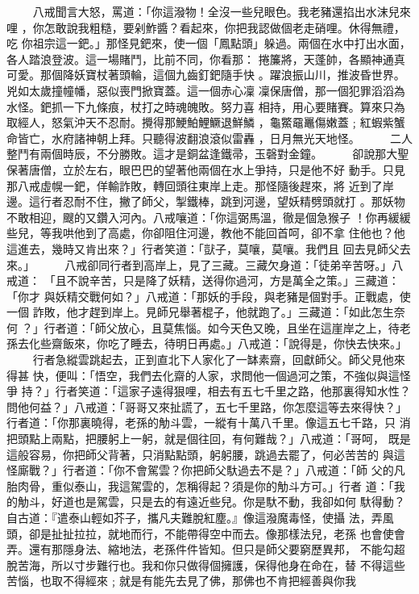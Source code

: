 \begin{pinyinscope}
{　　
八戒聞言大怒，罵道：「你這潑物！全沒一些兒眼色。我老豬還掐出水沫兒來哩
，你怎敢說我粗糙，要剁鮓醬？看起來，你把我認做個老走硝哩。休得無禮，吃
你祖宗這一鈀。」那怪見鈀來，使一個「鳳點頭」躲過。兩個在水中打出水面，
各人踏浪登波。這一場賭鬥，比前不同，你看那：
捲簾將，天蓬帥，各顯神通真可愛。那個降妖寶杖著頭輪，這個九齒釘鈀隨手快
。躍浪振山川，推波昏世界。兇如太歲撞幢幡，惡似喪門掀寶蓋。這一個赤心凜
凜保唐僧，那一個犯罪滔滔為水怪。鈀抓一下九條痕，杖打之時魂魄敗。努力喜
相持，用心要賭賽。算來只為取經人，怒氣沖天不忍耐。攪得那鯁鮊鯉鱖退鮮鱗
，龜鱉黿鼉傷嫩蓋﹔紅蝦紫蟹命皆亡，水府諸神朝上拜。只聽得波翻浪滾似雷轟
，日月無光天地怪。
　　
二人整鬥有兩個時辰，不分勝敗。這才是銅盆逢鐵帚，玉磬對金鐘。
　　
卻說那大聖保著唐僧，立於左右，眼巴巴的望著他兩個在水上爭持，只是他不好
動手。只見那八戒虛幌一鈀，佯輸詐敗，轉回頭往東岸上走。那怪隨後趕來，將
近到了岸邊。這行者忍耐不住，撇了師父，掣鐵棒，跳到河邊，望妖精劈頭就打
。那妖物不敢相迎，颼的又鑽入河內。八戒嚷道：「你這弼馬溫，徹是個急猴子
！你再緩緩些兒，等我哄他到了高處，你卻阻住河邊，教他不能回首呵，卻不拿
住他也？他這進去，幾時又肯出來？」行者笑道：「獃子，莫嚷，莫嚷。我們且
回去見師父去來。」
　　
八戒卻同行者到高岸上，見了三藏。三藏欠身道：「徒弟辛苦呀。」八戒道：
「且不說辛苦，只是降了妖精，送得你過河，方是萬全之策。」三藏道：「你才
與妖精交戰何如？」八戒道：「那妖的手段，與老豬是個對手。正戰處，使一個
詐敗，他才趕到岸上。見師兄舉著棍子，他就跑了。」三藏道：「如此怎生奈何
？」行者道：「師父放心，且莫焦惱。如今天色又晚，且坐在這崖岸之上，待老
孫去化些齋飯來，你吃了睡去，待明日再處。」八戒道：「說得是，你快去快來。」
　　
行者急縱雲跳起去，正到直北下人家化了一缽素齋，回獻師父。師父見他來得甚
快，便叫：「悟空，我們去化齋的人家，求問他一個過河之策，不強似與這怪爭
持？」行者笑道：「這家子遠得狠哩，相去有五七千里之路，他那裏得知水性？
問他何益？」八戒道：「哥哥又來扯謊了，五七千里路，你怎麼這等去來得快？」
行者道：「你那裏曉得，老孫的觔斗雲，一縱有十萬八千里。像這五七千路，只
消把頭點上兩點，把腰躬上一躬，就是個往回，有何難哉？」八戒道：「哥呵，
既是這般容易，你把師父背著，只消點點頭，躬躬腰，跳過去罷了，何必苦苦的
與這怪廝戰？」行者道：「你不會駕雲？你把師父馱過去不是？」八戒道：「師
父的凡胎肉骨，重似泰山，我這駕雲的，怎稱得起？須是你的觔斗方可。」行者
道：「我的觔斗，好道也是駕雲，只是去的有遠近些兒。你是馱不動，我卻如何
馱得動？自古道：『遣泰山輕如芥子，攜凡夫難脫紅塵。』像這潑魔毒怪，使攝
法，弄風頭，卻是扯扯拉拉，就地而行，不能帶得空中而去。像那樣法兒，老孫
也會使會弄。還有那隱身法、縮地法，老孫件件皆知。但只是師父要窮歷異邦，
不能勾超脫苦海，所以寸步難行也。我和你只做得個擁護，保得他身在命在，替
不得這些苦惱，也取不得經來﹔就是有能先去見了佛，那佛也不肯把經善與你我
}
\end{pinyinscope}
